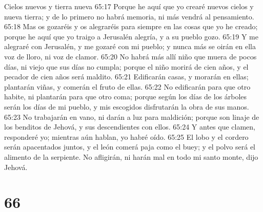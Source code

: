 Cielos nuevos y tierra nueva  
65:17 Porque he aquí que yo crearé nuevos cielos y nueva tierra; y de lo primero no habrá memoria, ni más vendrá al pensamiento.  
65:18 Mas os gozaréis y os alegraréis para siempre en las cosas que yo he creado; porque he aquí que yo traigo a Jerusalén alegría, y a su pueblo gozo.  
65:19 Y me alegraré con Jerusalén, y me gozaré con mi pueblo; y nunca más se oirán en ella voz de lloro, ni voz de clamor.  
65:20 No habrá más allí niño que muera de pocos días, ni viejo que sus días no cumpla; porque el niño morirá de cien años, y el pecador de cien años será maldito.  
65:21 Edificarán casas, y morarán en ellas; plantarán viñas, y comerán el fruto de ellas.  
65:22 No edificarán para que otro habite, ni plantarán para que otro coma; porque según los días de los árboles serán los días de mi pueblo, y mis escogidos disfrutarán la obra de sus manos.  
65:23 No trabajarán en vano, ni darán a luz para maldición; porque son linaje de los benditos de Jehová, y sus descendientes con ellos.  
65:24 Y antes que clamen, responderé yo; mientras aún hablan, yo habré oído.  
65:25 El lobo y el cordero serán apacentados juntos, y el león comerá paja como el buey; y el polvo será el alimento de la serpiente. No afligirán, ni harán mal en todo mi santo monte, dijo Jehová. 

\chapter{66}

